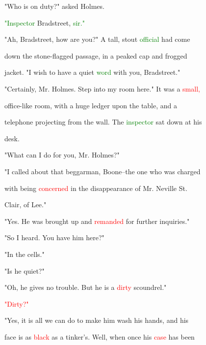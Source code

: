  "Who is on duty?" asked Holmes.



 \textcolor{green}{"Inspector} Bradstreet, \textcolor{green}{sir."}



 "Ah, Bradstreet, how are you?" A tall, stout \textcolor{green}{official} had come

 down the stone-flagged passage, in a peaked \textcolor{BurntOrange}{cap} and frogged

 jacket. "I wish to have a \textcolor{BurntOrange}{quiet} \textcolor{green}{word} with you, Bradstreet."

 "Certainly, Mr. Holmes. Step into my room here." It was a \textcolor{red}{small,}

 office-like room, with a huge ledger upon the table, and a

 telephone projecting from the wall. The \textcolor{green}{inspector} sat down at his

 desk.



 "What can I do for you, Mr. Holmes?"



 "I called about that beggarman, Boone--the one who was charged

 with being \textcolor{red}{concerned} in the disappearance of Mr. Neville St.

 Clair, of Lee."



 "Yes. He was brought up and \textcolor{red}{remanded} for further \textcolor{BurntOrange}{inquiries."}



 "So I heard. You have him here?"



 "In the cells."



 "Is he \textcolor{BurntOrange}{quiet?"}



 "Oh, he gives no trouble. But he is a \textcolor{red}{dirty} \textcolor{BurntOrange}{scoundrel."}



 \textcolor{red}{"Dirty?"}



 "Yes, it is all we can do to make him wash his hands, and his

 face is as \textcolor{red}{black} as a tinker's. Well, when once his \textcolor{red}{case} has been

